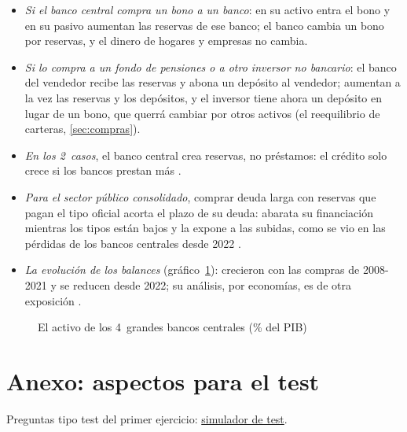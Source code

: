 \documentclass[11pt]{article}
\begin{document}
\begin{itemize}
\item \emph{Si el banco central compra un bono a un banco}: en su activo entra el bono y en su pasivo aumentan las reservas de ese banco; el banco cambia un bono por reservas, y el dinero de hogares y empresas no cambia.
\item \emph{Si lo compra a un fondo de pensiones o a otro inversor no bancario}: el banco del vendedor recibe las reservas y abona un depósito al vendedor; aumentan a la vez las reservas y los depósitos, y el inversor tiene ahora un depósito en lugar de un bono, que querrá cambiar por otros activos (el reequilibrio de carteras, \ref{sec:compras}).
\item \emph{En los 2~casos}, el banco central crea reservas, no préstamos: el crédito solo crece si los bancos prestan más\nocite{McLeayRadiaThomas2014Money} .
\item \emph{Para el sector público consolidado}, comprar deuda larga con reservas que pagan el tipo oficial acorta el plazo de su deuda: abarata su financiación mientras los tipos están bajos y la expone a las subidas, como se vio en las pérdidas de los bancos centrales desde 2022  .
\item \emph{La evolución de los balances} (gráfico~\ref{fig:balances-bancos-centrales}): crecieron con las compras de 2008-2021 y se reducen desde 2022\nocite{BCE2026ILM,FRED2026BalanceFed}; su análisis, por economías, es de otra exposición .
\end{itemize}

\begin{figure}[H]
\centering
\caption{El activo de los 4~grandes bancos centrales (\% del PIB)}\label{fig:balances-bancos-centrales}
\end{figure}

\section{Anexo: aspectos para el test}\label{anexo:test}

\begin{anotaciones}
Preguntas tipo test del primer ejercicio: \href{https://www.victorgutierrezmarcos.es/oposicion/temario/primer-ejercicio/test/simulador.html?tema=3.A.37}{simulador de test}.
\end{anotaciones}
\end{document}
